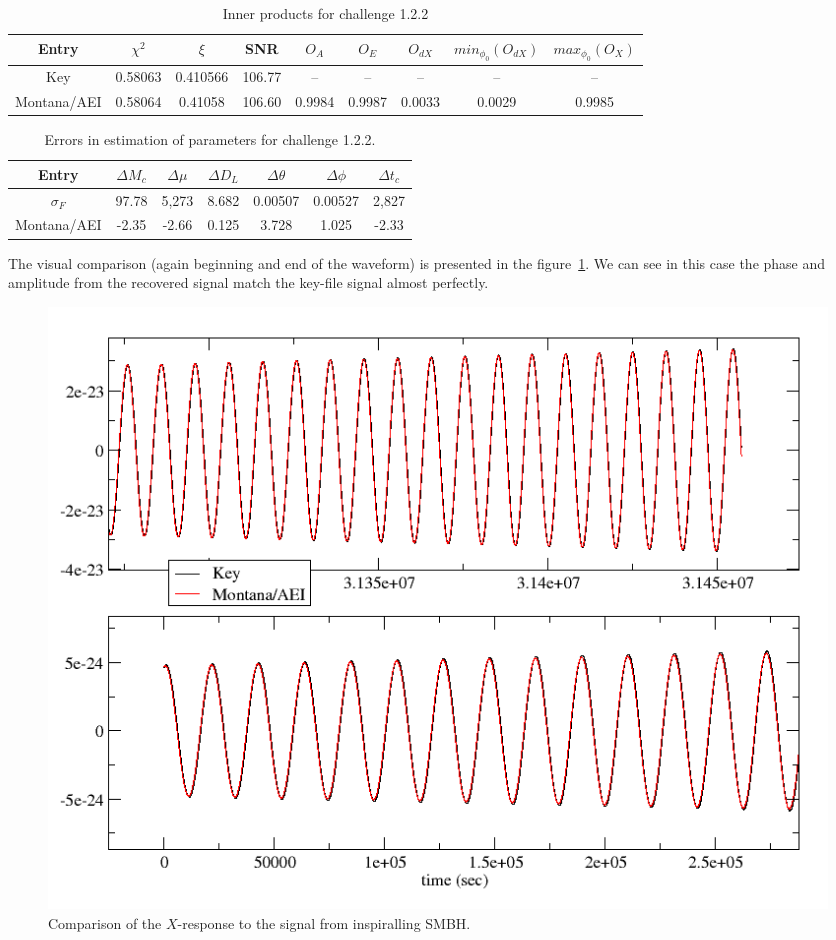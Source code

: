 \documentclass[11pt]{article}
\begin{document}
\begin{table}
\caption{\label{OlapsTable1.2.2} Inner products for challenge 1.2.2}
\begin{center}
\begin{tabular}{|c|c|c|c|c|c|c|c|c|}
\hline
Entry & $\chi^2$ & $\xi$ & SNR & $O_A$ & $O_E$ & $O_{dX}$ & $min_{\phi_0}(O_{dX})$ & $max_{\phi_0}(O_X)$\\
\hline
Key & 0.58063 & 0.410566 & 106.77 & -- & -- & -- & -- & -- \\
Montana/AEI & 0.58064 & 0.41058 &  106.60 & 0.9984 & 0.9987 & 0.0033 & 0.0029 & 0.9985 \\
\hline
\end{tabular}
\end{center}
\end{table}

\begin{table}
\caption{\label{Errors1.2.2} Errors in estimation of parameters for challenge 1.2.2. }
\begin{center}
\begin{tabular}{|c|c|c|c|c|c|c|}
\hline
Entry & $\Delta M_c$ & $\Delta \mu $ & $\Delta D_{L}$ & $\Delta \theta $ & $\Delta \phi $ & $\Delta t_c $ \\ 
\hline
$\sigma_{F}$ & 97.78 & 5,273 & 8.682 & 0.00507 & 0.00527 & 2,827\\
Montana/AEI & -2.35 & -2.66 & 0.125  & 3.728 & 1.025 & -2.33  \\
\hline
\end{tabular}
\end{center}
\end{table}


The visual comparison (again beginning and end of the waveform) is presented in the figure~\ref{fig1.2.2}.  We can see in this case the phase and amplitude from the recovered signal match the key-file signal almost perfectly.

\begin{figure}[ht]
\includegraphics[angle=0,width=1.0\textwidth]{Eval122.png}
\caption{Comparison of the $X$-response to the signal from inspiralling SMBH. }
\label{fig1.2.2}
\end{figure}
\end{document}
